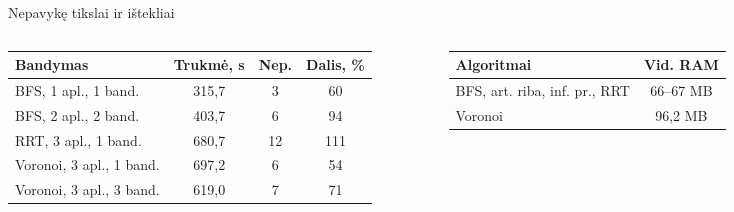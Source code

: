 \documentclass[12pt]{beamer}
\begin{document}
\begin{frame}{Nepavykę tikslai ir ištekliai}
    \begin{columns}[onlytextwidth]
        \begin{table}
            \centering
            \tiny
            \begin{tabular}{lccc}
                \toprule
                \textbf{Bandymas} & \textbf{Trukmė, s} & \textbf{Nep.} & \textbf{Dalis, \%} \\
                \midrule
                BFS, 1 apl., 1 band. & 315,7 & 3 & 60 \\
                BFS, 2 apl., 2 band. & 403,7 & 6 & 94 \\
                RRT, 3 apl., 1 band. & 680,7 & 12 & 111 \\
                Voronoi, 3 apl., 1 band. & 697,2 & 6 & 54 \\
                Voronoi, 3 apl., 3 band. & 619,0 & 7 & 71 \\
                \bottomrule
            \end{tabular}
        \end{table}
        \begin{table}
            \centering
            \scriptsize
            \begin{tabular}{lc}
                \toprule
                \textbf{Algoritmai} & \textbf{Vid. RAM} \\
                \midrule
                BFS, art. riba, inf. pr., RRT & 66--67 MB \\
                Voronoi & 96,2 MB \\
                \bottomrule
            \end{tabular}
        \end{table}
    \end{columns}
\end{frame}
\end{document}
